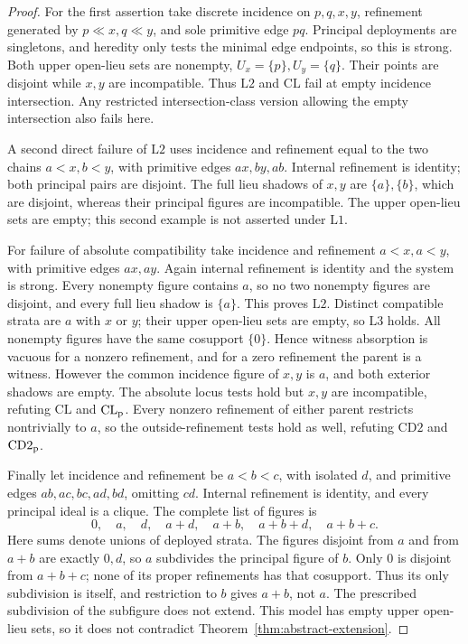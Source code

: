 \begin{proof}
For the first assertion take discrete incidence on $p,q,x,y$,
refinement generated by $p\ll x,q\ll y$, and sole primitive edge
$pq$. Principal deployments are singletons, and heredity only
tests the minimal edge endpoints, so this is strong. Both upper
open-lieu sets are nonempty, $U_x=\{p\},U_y=\{q\}$. Their points
are disjoint while $x,y$ are incompatible. Thus $\mathrm L2$
and $\mathrm{CL}$ fail at empty incidence intersection. Any
restricted intersection-class version allowing the empty
intersection also fails here.

A second direct failure of $\mathrm L2$ uses incidence and
refinement equal to the two chains $a<x,b<y$, with primitive
edges $ax,by,ab$. Internal refinement is identity; both principal
pairs are disjoint. The full lieu shadows of $x,y$ are
$\{a\},\{b\}$, which are disjoint, whereas their principal
figures are incompatible. The upper open-lieu sets are empty;
this second example is not asserted under $\mathrm L1$.

For failure of absolute compatibility take incidence and
refinement $a<x,a<y$, with primitive edges $ax,ay$.
Again internal refinement is identity and the system is strong.
Every nonempty figure contains $a$, so no two nonempty figures
are disjoint, and every full lieu shadow is $\{a\}$. This proves
$\mathrm L2$. Distinct compatible strata are $a$ with $x$ or
$y$; their upper open-lieu sets are empty, so $\mathrm L3$ holds.
All nonempty figures have the same cosupport $\{0\}$. Hence
witness absorption is vacuous for a nonzero refinement, and for
a zero refinement the parent is a witness. However the common
incidence figure of $x,y$ is $a$, and both exterior shadows are
empty. The absolute locus tests hold but $x,y$ are incompatible,
refuting $\mathrm{CL}$ and $\mathrm{CL}_{\rm p}$. Every nonzero
refinement of either parent restricts nontrivially to $a$, so the
outside-refinement tests hold as well, refuting $\mathrm{CD2}$
and $\mathrm{CD2}_{\rm p}$.

Finally let incidence and refinement be $a<b<c$, with isolated
$d$, and primitive edges $ab,ac,bc,ad,bd$, omitting $cd$.
Internal refinement is identity, and every principal ideal is
a clique. The complete list of figures is
\[
 0,\quad a,\quad d,\quad a+d,\quad a+b,\quad a+b+d,
 \quad a+b+c.
\]
Here sums denote unions of deployed strata. The figures disjoint
from $a$ and from $a+b$ are exactly $0,d$, so $a$ subdivides the
principal figure of $b$. Only $0$ is disjoint from $a+b+c$;
none of its proper refinements has that cosupport. Thus its only
subdivision is itself, and restriction to $b$ gives $a+b$, not
$a$. The prescribed subdivision of the subfigure does not extend.
This model has empty upper open-lieu sets, so it does not contradict
Theorem~\ref{thm:abstract-extension}.
\end{proof}

